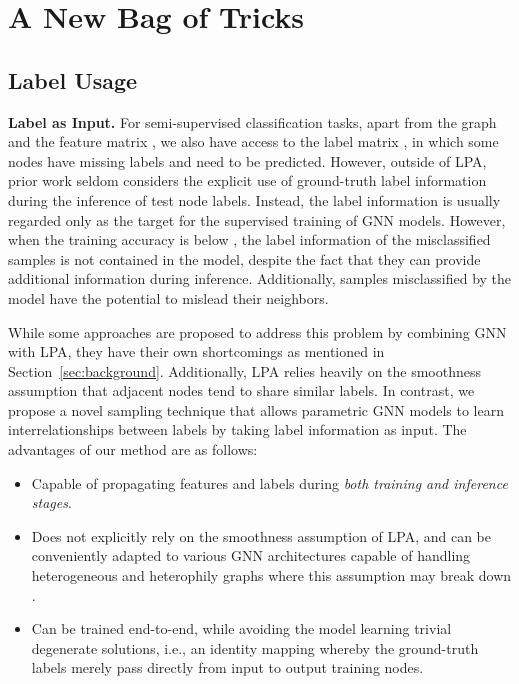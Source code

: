 \documentclass[sigconf,screen,nonacm]{acmart} \usepackage{booktabs}
\newcommand{\minisection}[1]{\vspace{5pt}\noindent\textbf{#1.}}
\begin{document}
	\section{A New Bag of Tricks} \label{sec:bag_of_tricks}
	
	\subsection{Label Usage} \label{sec:label_usage}
	
	\minisection{Label as Input}
	For semi-supervised classification tasks, apart from the graph  and the feature matrix , we also have access to the label matrix , in which some nodes have missing labels and need to be predicted.
	However, outside of LPA, prior work seldom considers the explicit use of ground-truth label information during the inference of test node labels.
	Instead, the label information is usually regarded only as the target for the supervised training of GNN models.
    However, when the training accuracy is below , the label information of the misclassified samples is not contained in the model, despite the fact that they can provide additional information during inference.
	Additionally, samples misclassified by the model have the potential to mislead their neighbors.
	
While some approaches are proposed to address this problem by combining GNN with LPA, they have their own shortcomings as mentioned in Section~\ref{sec:background}.
	Additionally, LPA relies heavily on the smoothness assumption that adjacent nodes tend to share similar labels.
In contrast, we propose a novel sampling technique that allows parametric GNN models to learn interrelationships between labels by taking label information as input. The advantages of our method are as follows:
	\begin{itemize}[topsep=3pt,leftmargin=10pt]
	\item Capable of propagating features and labels during \emph{both training and inference stages}.
	\item Does not explicitly rely on the smoothness assumption of LPA, and can be conveniently adapted to various GNN architectures capable of handling heterogeneous and heterophily graphs where this assumption may break down \citep{zhu2020beyond,busbridge2019relational,PeiWCLY20,schlichtkrull2018modeling,yang2021graph}.
	\item Can be trained end-to-end, while avoiding the model learning trivial degenerate solutions, i.e., an identity mapping whereby the ground-truth labels merely pass directly from input to output training nodes.
	\end{itemize}
	
\end{document}
